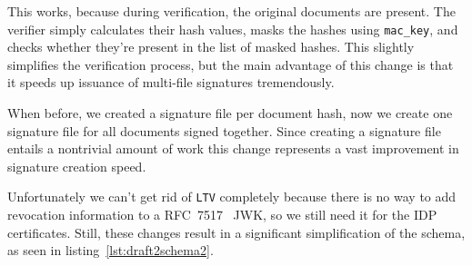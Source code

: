 This works, because during verification, the original documents are present.
The verifier simply calculates their hash values, masks the hashes using \texttt{mac\_key},
and checks whether they're present in the list of masked hashes.
This slightly simplifies the verification process,
but the main advantage of this change is that it speeds up issuance of multi-file signatures tremendously.

When before, we created a signature file per document hash, now we create one signature file for all documents signed together.
Since creating a signature file entails a nontrivial amount of work this change represents a vast improvement in signature creation speed.




Unfortunately we can't get rid of \texttt{LTV} completely because there is no way to add revocation information
to a RFC~7517~\cite{rfc7517} JWK, so we still need it for the \gls{IDP} certificates.
Still, these changes result in a significant simplification of the schema, as seen in listing~\ref{lst:draft2schema2}.

